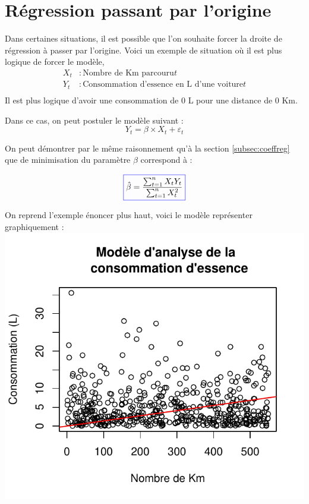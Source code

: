 \documentclass[11pt,french]{report}
\begin{document}
\section{Régression passant par l'origine}
Dans certaines situations, il est possible que l'on souhaite forcer la droite de régression à passer par l'origine.
Voici un exemple de situation où il est plus logique de forcer le modèle,
\begin{align*}
X_t &: \text{Nombre de Km parcouru} t \\
Y_t &: \text{Consommation d'essence en L d'une voiture} t\\
\end{align*}
Il est plus logique d'avoir une consommation de 0 L pour une distance de 0 Km.

Dans ce cas, on peut postuler le modèle suivant :
\begin{equation}
\label{eq:regzero}
Y_t = \beta \times X_t + \varepsilon_t
\end{equation}

On peut démontrer par le même raisonnement qu'à la section \ref{subsec:coeffreg} que de minimisation du paramètre $\beta$ correspond à :

\begin{equation}
\label{eq:betasimp}
\color{blue}
\boxed{\color{black}
\hat{\beta} = \frac{\sum_{t=1}^n X_t Y_t}{\sum_{t=1}^n X_t^2}}
\end{equation}

On reprend l'exemple énoncer plus haut, voici le modèle représenter graphiquement :
\includegraphics{notes_de_cours-010}
\end{document}
